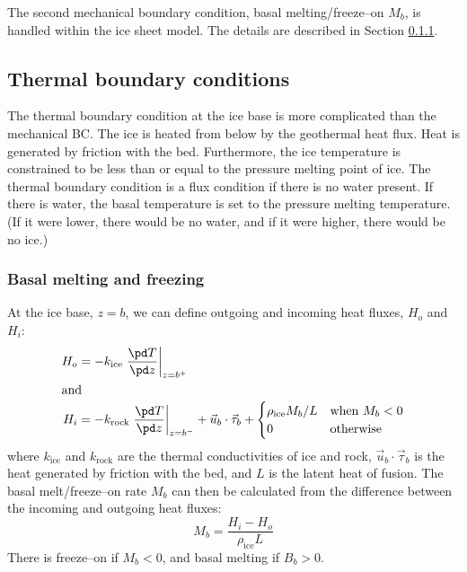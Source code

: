The second mechanical boundary condition, basal melting/freeze--on $M_b$, is handled within the ice sheet model. The details are described in Section \ref{num.sec.bc_melt}.

\subsection{Thermal boundary conditions}
The thermal boundary condition at the ice base is more complicated than the mechanical BC. The ice is heated from below by the geothermal heat flux. Heat is generated by friction with the bed. Furthermore, the ice temperature is constrained to be less than or equal to the pressure melting point of ice. The thermal boundary condition is a flux condition if there is no water present. If there is water, the basal temperature is set to the pressure melting temperature. (If it were lower, there would be no water, and if it were higher, there would be no ice.)

\subsubsection{Basal melting and freezing}\label{num.sec.bc_melt}
At the ice base, $z=b$, we can define outgoing and incoming heat fluxes, $H_o$ and $H_i$:
\begin{subequations}
  \begin{align}
    H_o&=-k_{\text{ice}}\left.\frac{\pd T}{\pd z}\right|_{z=b^+}\\
    \intertext{and}
    H_i&=-k_{\text{rock}}\left.\frac{\pd T}{\pd z}\right|_{z=b^-}+\vec{u}_b\cdot\vec{\tau}_b+
    \begin{cases}
      {\rho_{\text{ice}}M_b}/{L} & \text{when $M_b<0$} \\
      0 & \text{otherwise}
    \end{cases}
  \end{align}
\end{subequations}
where $k_{\text{ice}}$ and $k_{\text{rock}}$ are the thermal conductivities of ice and rock, $\vec{u}_b\cdot\vec{\tau}_b$ is the heat generated by friction with the bed, and $L$ is the latent heat of fusion. The basal melt/freeze--on rate $M_b$ can then be calculated from the difference between the incoming and outgoing heat fluxes:
\begin{equation}
  \label{bc.eq.meltrate}
  M_b=\frac{H_i-H_o}{\rho_{\text{ice}}L}
\end{equation}
There is freeze--on if $M_b < 0$, and basal melting if $B_b > 0$.

